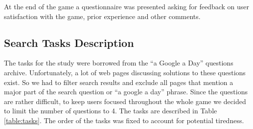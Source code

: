 \documentclass{sig-alternate}
\begin{document}
At the end of the game a questionnaire was presented asking for feedback on user satisfaction with the game, prior experience and other comments.

\subsection{Search Tasks Description}

The tasks for the study were borrowed from the ``a Google a Day'' questions archive.
Unfortunately, a lot of web pages discussing solutions to these questions exist.
So we had to filter search results and exclude all pages that mention a major part of the search question or ``a google a day'' phrase.
Since the questions are rather difficult, to keep users focused throughout the whole game we decided to limit the number of questions to 4.
The tasks are described in Table \ref{table:tasks}.
The order of the tasks was fixed to account for potential tiredness.
\end{document}
